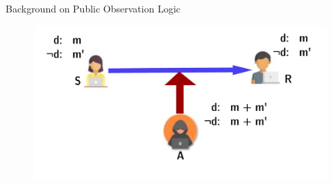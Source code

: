 \documentclass{beamer}
\begin{document}
\begin{frame}{Background on Public Observation Logic}
    \begin{figure}
        \centering
        \includegraphics[scale=0.15]{images/comm-slide-allexpect.jpg}
        \label{fig:my_label}
    \end{figure}
\end{frame}
\end{document}
